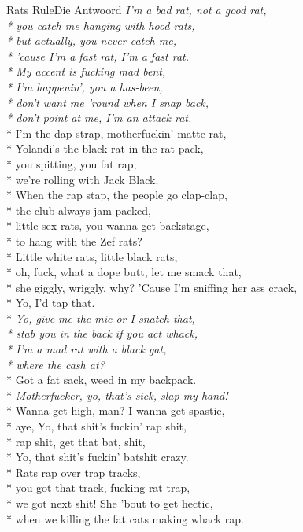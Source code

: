 \documentclass[10.5pt]{book}
\begin{document}
\begin{poem}{Rats Rule}{Die Antwoord}
\textit{I'm a bad rat, not a good rat,\\*
you catch me hanging with hood rats,\\*
but actually, you never catch me,\\*
'cause I'm a fast rat, I'm a fast rat.\\*
My accent is fucking mad bent,\\*
I'm happenin', you a has-been,\\*
don't want me 'round when I snap back,\\*
don't point at me, I'm an attack rat.}\\*
I'm the dap strap, motherfuckin' matte rat,\\*
Yolandi's the black rat in the rat pack,\\*
you spitting, you fat rap,\\*
we're rolling with Jack Black.\\*
When the rap stap, the people go clap-clap,\\*
the club always jam packed,\\*
little sex rats, you wanna get backstage,\\*
to hang with the Zef rats?\\*
Little white rats, little black rats,\\*
oh, fuck, what a dope butt, let me smack that,\\*
she giggly, wriggly, why? 'Cause I'm sniffing her ass crack,\\*
Yo, I'd tap that.\\*
\textit{Yo, give me the mic or I snatch that,\\*
stab you in the back if you act whack,\\*
I'm a mad rat with a black gat,\\*
where the cash at?}\\*
Got a fat sack, weed in my backpack.\\*
\textit{Motherfucker, yo, that's sick, slap my hand!}\\*
Wanna get high, man? I wanna get spastic,\\*
aye, Yo, that shit's fuckin' rap shit,\\*
rap shit, get that bat, shit,\\*
Yo, that shit's fuckin' batshit crazy.\\*
Rats rap over trap tracks,\\*
you got that track, fucking rat trap,\\*
we got next shit! She 'bout to get hectic,\\*
when we killing the fat cats making whack rap.


\end{poem}
\end{document}

